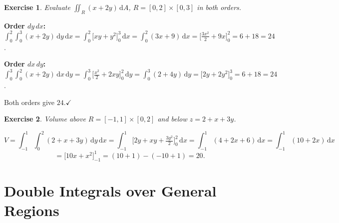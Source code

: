 \documentclass[12pt,a4paper]{article}
\theoremstyle{exstyle}
\newtheorem{exercise}{Exercise}[section]
\newcommand{\dif}[1]{\,\mathrm{d}#1}
\begin{document}
\begin{exercise}
Evaluate $\iint_R(x+2y)\dif{A}$, $R=[0,2]\times[0,3]$ in both orders.
\end{exercise}
\begin{solbox}
\textbf{Order $dy\,dx$:}
$\int_0^2\int_0^3(x+2y)\dif{y}\dif{x}=\int_0^2\bigl[xy+y^2\bigr]_0^3\dif{x}=\int_0^2(3x+9)\dif{x}=\bigl[\tfrac{3x^2}{2}+9x\bigr]_0^2=6+18=24$.

\textbf{Order $dx\,dy$:}
$\int_0^3\int_0^2(x+2y)\dif{x}\dif{y}=\int_0^3\bigl[\tfrac{x^2}{2}+2xy\bigr]_0^2\dif{y}=\int_0^3(2+4y)\dif{y}=\bigl[2y+2y^2\bigr]_0^3=6+18=24$.

Both orders give $\boxed{24}$.\hfill$\checkmark$
\end{solbox}

\begin{exercise}
Volume above $R=[-1,1]\times[0,2]$ and below $z=2+x+3y$.
\end{exercise}
\begin{solbox}
\[
  V=\int_{-1}^1\int_0^2(2+x+3y)\dif{y}\dif{x}
  =\int_{-1}^1\bigl[2y+xy+\tfrac{3y^2}{2}\bigr]_0^2\dif{x}
  =\int_{-1}^1(4+2x+6)\dif{x}=\int_{-1}^1(10+2x)\dif{x}
\]
\[
  =\bigl[10x+x^2\bigr]_{-1}^1=(10+1)-(-10+1)=\boxed{20}.
\]
\end{solbox}

\section{Double Integrals over General Regions}
\end{document}
